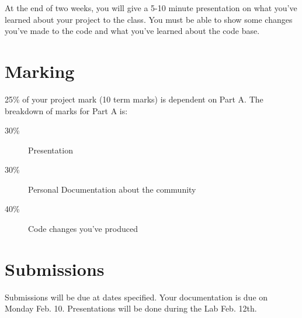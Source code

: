 \documentclass[letterpaper]{article}
\begin{document}
At the end of two weeks, you will give a 5-10 minute presentation on what
you've learned about your project to the class.  You must be able to show some
changes you've made to the code and what you've learned about the code base.


\section*{Marking}

25\% of your project mark (10 term marks) is dependent on Part A.  The
breakdown of marks for Part A is:

\begin{description}
\item[30\%] Presentation
\item[30\%] Personal Documentation about the community
\item[40\%] Code changes you've produced
\end{description}

\section{Submissions}

Submissions will be due at dates specified. Your documentation is due on
Monday Feb. 10.   Presentations will be done during the Lab Feb. 12th.

\end{document}
